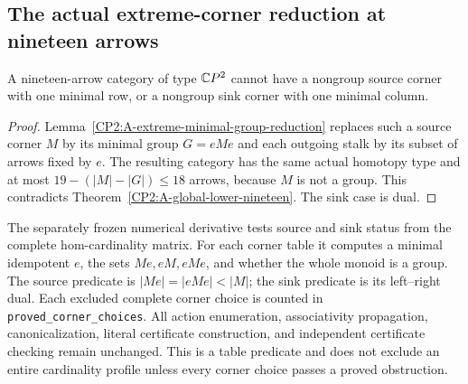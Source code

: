 \subsection{The actual extreme-corner reduction at nineteen arrows}

\begin{corollary}
\label{CP2:A-extreme-minimal-group-nineteen}
A nineteen-arrow category of type $\mathbb{C}P^2$ cannot have a nongroup source
corner with one minimal row, or a nongroup sink corner with one minimal
column.
\end{corollary}
\begin{proof}
Lemma~\ref{CP2:A-extreme-minimal-group-reduction} replaces such a source
corner $M$ by its minimal group $G=eMe$ and each outgoing stalk by its
subset of arrows fixed by $e$. The resulting category has the same
actual homotopy type and at most $19-(|M|-|G|)\le18$ arrows, because
$M$ is not a group. This contradicts
Theorem~\ref{CP2:A-global-lower-nineteen}. The sink case is dual.
\end{proof}

The separately frozen numerical derivative tests source and sink status
from the complete hom-cardinality matrix. For each corner table it
computes a minimal idempotent $e$, the sets $Me,eM,eMe$, and whether the
whole monoid is a group. The source predicate is
$|Me|=|eMe|<|M|$; the sink predicate is its left--right dual. Each
excluded complete corner choice is counted in
\texttt{proved\_corner\_choices}. All action enumeration, associativity
propagation, canonicalization, literal certificate construction, and
independent certificate checking remain unchanged. This is a table
predicate and does not exclude an entire cardinality profile unless
every corner choice passes a proved obstruction.
